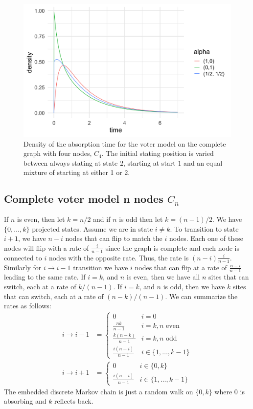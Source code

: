 \begin{figure}[H]
  \centering
    \includegraphics[width=.80\textwidth]{figures/voter_density_c4.png}
   \caption{Density of the absorption time for the voter model on the complete graph with four nodes, $C_4$. The initial stating position is varied between always stating at state $2$, starting at start $1$ and an equal mixture of starting at either 1 or 2.}
  \label{fig:voter_density_c4}
\end{figure}

\subsection{Complete voter model n nodes  \texorpdfstring{$C_n$}{VCn}}
If $n$ is even, then let $k = n / 2$ and if $n$ is odd then let $k = (n - 1)/2$.
We have $\{0,\ldots, k\}$ projected states.
Assume we are in state $i \not = k$.
To transition to state $i + 1$, we have $n - i$ nodes that can flip to match the $i$ nodes.
Each one of these nodes will flip with a rate of $\frac{i}{n - 1}$ since the graph is complete and each node is connected to $i$ nodes with the opposite rate.
Thus, the rate is $(n - i) \frac{i}{n - 1}$.
Similarly for $i \to i - 1$ transition we have $i$ nodes that can flip at a rate of $\frac{n - i}{n - 1}$ leading to the same rate.
If $i = k$, and $n$ is even, then we have all $n$ sites that can switch, each at a rate of $k / (n - 1)$.
If $i = k$, and $n$ is odd, then we have $k$ sites that can switch, each at a rate of $(n - k ) / (n - 1)$.
We can summarize the rates as follows:
\begin{align*}
    i \to i - 1 &= \begin{cases}
        0 & i = 0\\
        \frac{nk}{n - 1}  & i = k, n \text{ even}\\
        \frac{k (n - k)}{n - 1} & i = k, n \text{ odd}\\
        \frac{i (n - i)}{n - 1}  & i \in \{1,\ldots, k - 1\}
    \end{cases}\\
    i \to i + 1 &= \begin{cases}
        0 & i \in \{0, k\}\\
        \frac{i (n - i)}{n - 1}  & i \in \{1,\ldots, k - 1\}
    \end{cases}
\end{align*}
The embedded discrete Markov chain is just a random walk on $\{0, k\}$ where 0 is absorbing and $k$ reflects back.

